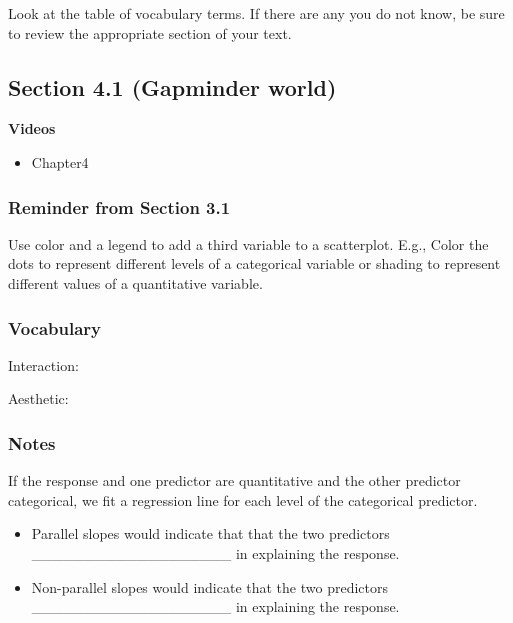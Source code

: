 \documentclass[
]{report}
\providecommand{\tightlist}{%
  \setlength{\itemsep}{0pt}\setlength{\parskip}{0pt}}
\newcommand{\rgs}{\vspace{12pt}} %
\begin{document}
Look at the table of vocabulary terms. If there are any you do not know, be sure to review the appropriate section of your text.

\hypertarget{section-4.1-gapminder-world}{%
\subsection*{Section 4.1 (Gapminder world)}\label{section-4.1-gapminder-world}}


\textbf{Videos}

\begin{itemize}
\tightlist
\item
  Chapter4
\end{itemize}


\hypertarget{reminder-from-section-3.1}{%
\subsubsection*{Reminder from Section 3.1}\label{reminder-from-section-3.1}}

Use color and a legend to add a third variable to a scatterplot. E.g., Color the dots to represent different levels of a categorical variable or shading to represent different values of a quantitative variable.

\hypertarget{vocabulary-9}{%
\subsubsection*{Vocabulary}\label{vocabulary-9}}

Interaction:
\rgs

Aesthetic:
\rgs

\hypertarget{notes-12}{%
\subsubsection*{Notes}\label{notes-12}}

If the response and one predictor are quantitative and the other predictor categorical, we fit a regression line for each level of the categorical predictor.

\begin{itemize}
\item
  Parallel slopes would indicate that that the two predictors \_\_\_\_\_\_\_\_\_\_\_\_\_\_\_\_\_\_\_ in explaining the response.
\item
  Non-parallel slopes would indicate that the two predictors \_\_\_\_\_\_\_\_\_\_\_\_\_\_\_\_\_\_\_ in explaining the response.
\end{itemize}
\end{document}
